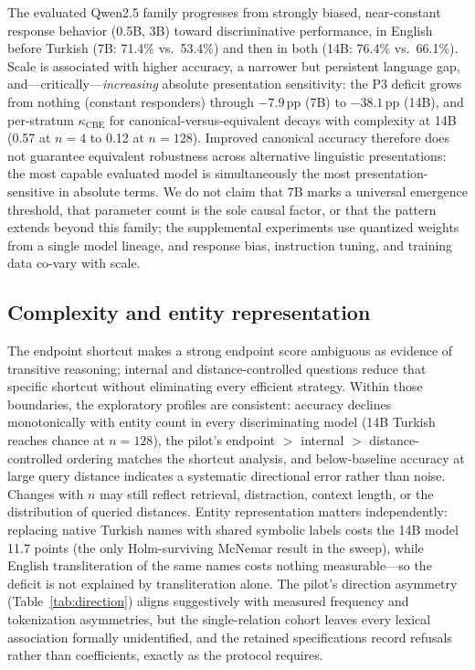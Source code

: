 The evaluated Qwen2.5 family progresses from strongly biased, near-constant response behavior (0.5B, 3B)
toward discriminative performance, in English before Turkish (7B: 71.4\% vs.\ 53.4\%) and then in both
(14B: 76.4\% vs.\ 66.1\%). Scale is associated with higher accuracy, a narrower but persistent language
gap, and---critically---\emph{increasing} absolute presentation sensitivity: the P3 deficit grows from
nothing (constant responders) through $-7.9$\,pp (7B) to $-38.1$\,pp (14B), and per-stratum
$\kappa_{\mathrm{CBE}}$ for canonical-versus-equivalent decays with complexity at 14B (0.57 at $n{=}4$ to
0.12 at $n{=}128$). Improved canonical accuracy therefore does not guarantee equivalent robustness across
alternative linguistic presentations: the most capable evaluated model is simultaneously the most
presentation-sensitive in absolute terms. We do not claim that 7B marks a universal emergence threshold,
that parameter count is the sole causal factor, or that the pattern extends beyond this family; the
supplemental experiments use quantized weights from a single model lineage, and response bias, instruction
tuning, and training data co-vary with scale.

\subsection{Complexity and entity representation}

The endpoint shortcut makes a strong endpoint score ambiguous as evidence of transitive reasoning;
internal and distance-controlled questions reduce that specific shortcut without eliminating every
efficient strategy. Within those boundaries, the exploratory profiles are consistent: accuracy declines
monotonically with entity count in every discriminating model (14B Turkish reaches chance at $n{=}128$),
the pilot's endpoint $>$ internal $>$ distance-controlled ordering matches the shortcut analysis, and
below-baseline accuracy at large query distance indicates a systematic directional error rather than noise.
Changes with $n$ may still reflect retrieval, distraction, context length, or the distribution of queried
distances. Entity representation matters independently: replacing native Turkish names with shared symbolic
labels costs the 14B model 11.7 points (the only Holm-surviving McNemar result in the sweep), while English
transliteration of the same names costs nothing measurable---so the deficit is not explained by
transliteration alone. The pilot's direction asymmetry (Table~\ref{tab:direction}) aligns suggestively with
measured frequency and tokenization asymmetries, but the single-relation cohort leaves every lexical
association formally unidentified, and the retained specifications record refusals rather than
coefficients, exactly as the protocol requires.

